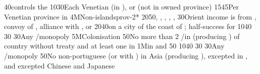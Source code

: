 {}{40}{\paysmajeurVenise controls the }%
%
%
{10}{30}{Each Venetian \Presidio (in ), or \regionBalkans
  (not in owned province)}%
%
%
{15}{45}{Per Venetian province in \regionBalkans}%
%
\EUobjective4M{Non-\TUR islands}{prov-2*}%
{20}{50}{\provinceChypre, \provinceKreta, \provinceCyclades, \provinceCorfu,
  \provinceMalta, \provinceRhodos}%
%
%
%
{}{30}{Orient income is from , convoy of \villeIzmir,
  alliance with \paysaden, \paysoman or \paysgujarat}%
%
 
%
%
{20}{40}{\COL on a city of the coast of \continentIndia; half-success for
  \granderegionCeylan}%
%
%
{10}{40}{}%
%
%
{}{30}{}%
%
%
{}{30}{Any \CTZ/\STZ monopoly}%
%
\EUobjective5M{Colonisation}{}%
{}{50}{No more than 2 \COL/\TP in \continentAsia (producing \POSPICE) of
  country without treaty and at least one \COL in \continentBrazil}%
%
%
%
\EUobjective1M{\TP in \payschine and \paysjapon}{}%
{}{50}{}%
%
%
{10}{40}{}%
%
%
{}{30}{}%
%
%
{}{30}{Any \CTZ/\STZ monopoly}%
%
%
{}{50}{No non-portuguese \TP (or with \dipAT) in Asia (producing \POSPICE),
  excepted in , and excepted Chinese and Japanese
  \TP}%


